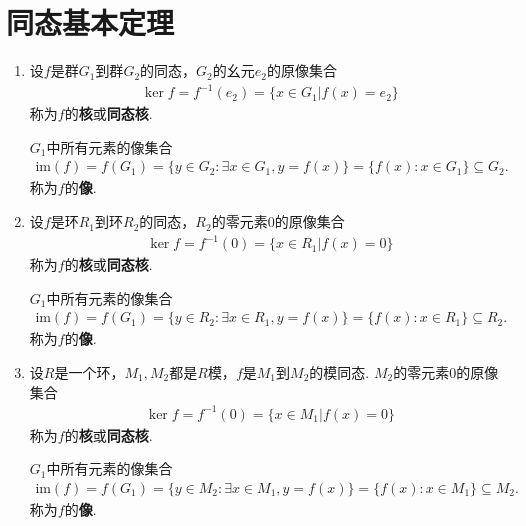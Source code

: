 \documentclass[../../main.tex]{subfiles}%
\begin{document}
\section{同态基本定理}

\begin{definition}[同态核]
\begin{enumerate}
\item 设$f$是群$G_1$到群$G_2$的同态，$G_2$的幺元$e_2$的原像集合
\begin{align*}
\ker f = f^{-1}(e_2) = \{x \in G_1 | f(x) = e_2\}
\end{align*}
称为$f$的\textbf{核}或\textbf{同态核}.

$G_1$中所有元素的像集合
\begin{align*}
\mathrm{im}(f) =f(G_1)= \{y \in G_2 : \exists x \in G_1, y = f(x)\} = \{f(x) : x \in G_1\} \subseteq G_2.
\end{align*}
称为$f$的\textbf{像}.

\item 设$f$是环$R_1$到环$R_2$的同态，$R_2$的零元素$0$的原像集合
\begin{align*}
\ker f = f^{-1}(0) = \{x \in R_1 | f(x) = 0\}
\end{align*}
称为$f$的\textbf{核}或\textbf{同态核}.

$G_1$中所有元素的像集合
\begin{align*}
\mathrm{im}(f)=f(G_1) = \{y \in R_2 : \exists x \in R_1, y = f(x)\} = \{f(x) : x \in R_1\} \subseteq R_2.
\end{align*}
称为$f$的\textbf{像}.

\item 设$R$是一个环，$M_1, M_2$都是$R$模，$f$是$M_1$到$M_2$的模同态. $M_2$的零元素$0$的原像集合
\begin{align*}
\ker f = f^{-1}(0) = \{x \in M_1 | f(x) = 0\}
\end{align*}
称为$f$的\textbf{核}或\textbf{同态核}.

$G_1$中所有元素的像集合
\begin{align*}
\mathrm{im}(f) =f(G_1)= \{y \in M_2 : \exists x \in M_1, y = f(x)\} = \{f(x) : x \in M_1\} \subseteq M_2.
\end{align*}
称为$f$的\textbf{像}.
\end{enumerate}
\end{definition}
\end{document}
